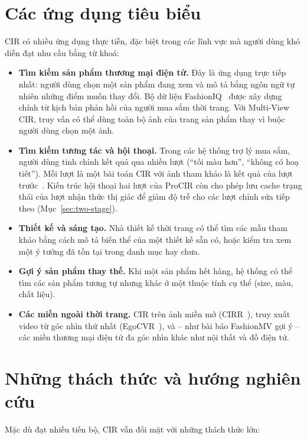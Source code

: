 \section{Các ứng dụng tiêu biểu}\label{sec:applications}

CIR có nhiều ứng dụng thực tiễn, đặc biệt trong các lĩnh vực mà người dùng khó diễn đạt nhu cầu bằng từ khoá:

\begin{itemize}
    \item \textbf{Tìm kiếm sản phẩm thương mại điện tử.} Đây là ứng dụng trực tiếp nhất: người dùng chọn một sản phẩm đang xem và mô tả bằng ngôn ngữ tự nhiên những điểm muốn thay đổi. Bộ dữ liệu FashionIQ~\cite{wu2021fashioniq} được xây dựng chính từ kịch bản phản hồi của người mua sắm thời trang. Với Multi-View CIR, truy vấn có thể dùng toàn bộ ảnh của trang sản phẩm thay vì buộc người dùng chọn một ảnh.
    \item \textbf{Tìm kiếm tương tác và hội thoại.} Trong các hệ thống trợ lý mua sắm, người dùng tinh chỉnh kết quả qua nhiều lượt (``tối màu hơn'', ``không có hoạ tiết''). Mỗi lượt là một bài toán CIR với ảnh tham khảo là kết quả của lượt trước~\cite{chen2025mai}. Kiến trúc hội thoại hai lượt của ProCIR còn cho phép lưu cache trạng thái của lượt nhận thức thị giác để giảm độ trễ cho các lượt chỉnh sửa tiếp theo (Mục~\ref{sec:two-stage}).
    \item \textbf{Thiết kế và sáng tạo.} Nhà thiết kế thời trang có thể tìm các mẫu tham khảo bằng cách mô tả biến thể của một thiết kế sẵn có, hoặc kiểm tra xem một ý tưởng đã tồn tại trong danh mục hay chưa.
    \item \textbf{Gợi ý sản phẩm thay thế.} Khi một sản phẩm hết hàng, hệ thống có thể tìm các sản phẩm tương tự nhưng khác ở một thuộc tính cụ thể (size, màu, chất liệu).
    \item \textbf{Các miền ngoài thời trang.} CIR trên ảnh miền mở (CIRR~\cite{liu2021cirr}), truy xuất video từ góc nhìn thứ nhất (EgoCVR~\cite{hummel2024egocvr}), và -- như bài báo FashionMV gợi ý -- các miền thương mại điện tử đa góc nhìn khác như nội thất và đồ điện tử.
\end{itemize}

\section{Những thách thức và hướng nghiên cứu}\label{sec:challenges}

Mặc dù đạt nhiều tiến bộ, CIR vẫn đối mặt với những thách thức lớn:

